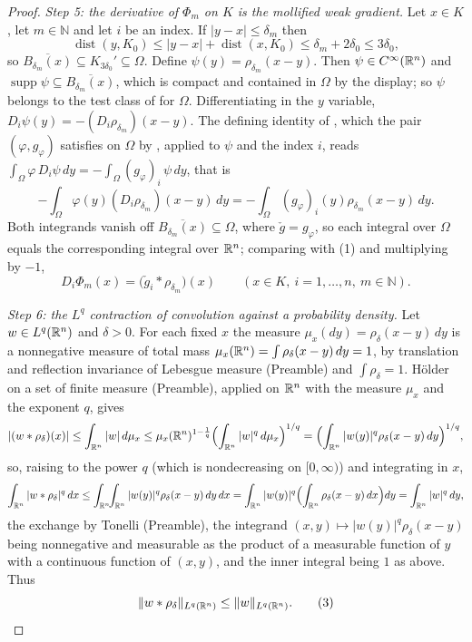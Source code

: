 \begin{proof}
\emph{Step 5: the derivative of $\Phi_m$ on $K$ is the mollified weak gradient.}
Let $x\in K$, let $m\in\mathbb{N}$ and let $i$ be an index.  If $|y-x|\le\delta_m$ then
\[
\operatorname{dist}(y,K_0)\le|y-x|+\operatorname{dist}(x,K_0)
\le\delta_m+2\delta_0\le3\delta_0 ,
\]
so $\overline{B_{\delta_m}(x)}\subseteq K_{3\delta_0}'\subseteq\Omega$.  Define
$\psi(y)=\rho_{\delta_m}(x-y)$.  Then $\psi\in C^\infty(\mathbb{R}^n)$ and
$\operatorname{supp}\psi\subseteq\overline{B_{\delta_m}(x)}$, which is compact
and contained in $\Omega$ by the display; so $\psi$ belongs to the test class of
 for $\Omega$.  Differentiating in the $y$ variable,
$D_i\psi(y)=-(D_i\rho_{\delta_m})(x-y)$.  The defining identity of
, which the pair $(\varphi,g_\varphi)$ satisfies on
$\Omega$ by , applied to $\psi$ and the index $i$, reads
$\int_\Omega\varphi\,D_i\psi\,dy=-\int_\Omega(g_\varphi)_i\,\psi\,dy$, that is
\[
-\int_\Omega\varphi(y)(D_i\rho_{\delta_m})(x-y)\,dy
=-\int_\Omega(g_\varphi)_i(y)\rho_{\delta_m}(x-y)\,dy .
\]
Both integrands vanish off $\overline{B_{\delta_m}(x)}\subseteq\Omega$, where
$\check g=g_\varphi$, so each integral over $\Omega$ equals the corresponding
integral over $\mathbb{R}^n$; comparing with (1) and multiplying by $-1$,
\[
D_i\Phi_m(x)=\bigl(\check g_i*\rho_{\delta_m}\bigr)(x)
\qquad(x\in K,\ i=1,\dots,n,\ m\in\mathbb{N}).
\tag{2}
\]

\emph{Step 6: the $L^q$ contraction of convolution against a probability
density.}  Let $w\in L^q(\mathbb{R}^n)$ and $\delta>0$.  For each fixed $x$ the measure
$\mu_x(dy)=\rho_\delta(x-y)\,dy$ is a nonnegative measure of total mass
$\mu_x(\mathbb{R}^n)=\int\rho_\delta(x-y)\,dy=1$, by translation and reflection
invariance of Lebesgue measure (Preamble) and $\int\rho_\delta=1$.  H\"older on
a set of finite measure (Preamble), applied on $\mathbb{R}^n$ with the measure $\mu_x$
and the exponent $q$, gives
\[
|(w*\rho_\delta)(x)|\le\int_{\mathbb{R}^n}|w|\,d\mu_x
\le\mu_x(\mathbb{R}^n)^{1-\frac1q}\Bigl(\int_{\mathbb{R}^n}|w|^q\,d\mu_x\Bigr)^{1/q}
=\Bigl(\int_{\mathbb{R}^n}|w(y)|^q\rho_\delta(x-y)\,dy\Bigr)^{1/q},
\]
so, raising to the power $q$ (which is nondecreasing on $[0,\infty)$) and
integrating in $x$,
\[
\int_{\mathbb{R}^n}|w*\rho_\delta|^q\,dx
\le\int_{\mathbb{R}^n}\!\!\int_{\mathbb{R}^n}|w(y)|^q\rho_\delta(x-y)\,dy\,dx
=\int_{\mathbb{R}^n}|w(y)|^q\Bigl(\int_{\mathbb{R}^n}\rho_\delta(x-y)\,dx\Bigr)dy
=\int_{\mathbb{R}^n}|w|^q\,dy ,
\]
the exchange by Tonelli (Preamble), the integrand
$(x,y)\mapsto|w(y)|^q\rho_\delta(x-y)$ being nonnegative and measurable as the
product of a measurable function of $y$ with a continuous function of $(x,y)$,
and the inner integral being $1$ as above.  Thus
\[
\|w*\rho_\delta\|_{L^q(\mathbb{R}^n)}\le\|w\|_{L^q(\mathbb{R}^n)} .
\tag{3}
\]


\end{proof}
